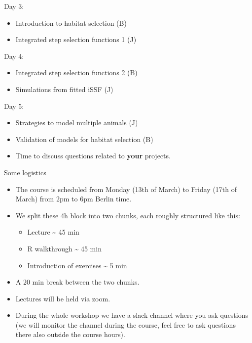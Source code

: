 \documentclass[ignorenonframetext,,t]{beamer}
\let\oldtextbf\textbf
\renewcommand{\textbf}[1]{\textcolor{spamwell}{\oldtextbf{#1}}}
\providecommand{\tightlist}{%
\setlength{\itemsep}{0pt}\setlength{\parskip}{0pt}}
\providecommand{\tightlist}{%
\setlength{\itemsep}{0pt}\setlength{\parskip}{0pt}}
\renewcommand{\tightlist}{\setlength{\itemsep}{1.4ex}\setlength{\parskip}{0pt}}
\begin{document}
\begin{frame}
\begin{block}{Day 3:}
\protect\hypertarget{day-3}{}
\begin{itemize}
\tightlist
\item
  Introduction to habitat selection (B)
\item
  Integrated step selection functions 1 (J)
\end{itemize}
\end{block}

\begin{block}{Day 4:}
\protect\hypertarget{day-4}{}
\begin{itemize}
\tightlist
\item
  Integrated step selection functions 2 (B)
\item
  Simulations from fitted iSSF (J)
\end{itemize}
\end{block}

\begin{block}{Day 5:}
\protect\hypertarget{day-5}{}
\begin{itemize}
\tightlist
\item
  Strategies to model multiple animals (J)
\item
  Validation of models for habitat selection (B)
\item
  Time to discuss questions related to \textbf{your} projects.
\end{itemize}
\end{block}
\end{frame}

\begin{frame}
\begin{block}{Some logistics}
\protect\hypertarget{some-logistics}{}
\begin{itemize}
\item
  The course is scheduled from Monday (13th of March) to Friday (17th of
  March) from 2pm to 6pm Berlin time.
\item
  We split these 4h block into two chunks, each roughly structured like
  this:

  \begin{itemize}
  \tightlist
  \item
    Lecture \textasciitilde{} 45 min
  \item
    R walkthrough \textasciitilde{} 45 min
  \item
    Introduction of exercises \textasciitilde{} 5 min
  \end{itemize}
\item
  A 20 min break between the two chunks.
\item
  Lectures will be held via zoom.
\item
  During the whole workshop we have a slack channel where you ask
  questions (we will monitor the channel during the course, feel free to
  ask questions there also outside the course hours).
\end{itemize}
\end{block}
\end{frame}
\end{document}
